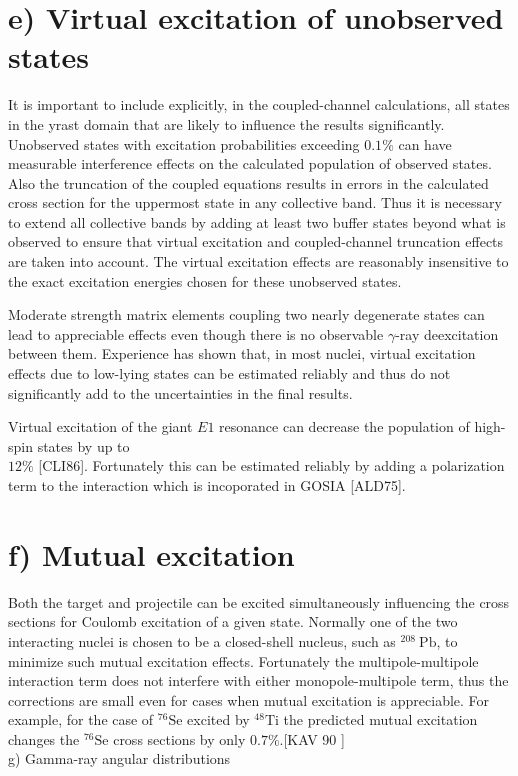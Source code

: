 \documentclass[10pt]{article}
\begin{document}
\section*{e) Virtual excitation of unobserved states}
It is important to include explicitly, in the coupled-channel calculations, all states in the yrast domain that are likely to influence the results significantly. Unobserved states with excitation probabilities exceeding $0.1 \%$ can have measurable interference effects on the calculated population of observed states. Also the truncation of the coupled equations results in errors in the calculated cross section for the uppermost state in any collective band. Thus it is necessary to extend all collective bands by adding at least two buffer states beyond what is observed to ensure that virtual excitation and coupled-channel truncation effects are taken into account. The virtual excitation effects are reasonably insensitive to the exact excitation energies chosen for these unobserved states.

Moderate strength matrix elements coupling two nearly degenerate states can lead to appreciable effects even though there is no observable $\gamma$-ray deexcitation between them. Experience has shown that, in most nuclei, virtual excitation effects due to low-lying states can be estimated reliably and thus do not significantly add to the uncertainties in the final results.

Virtual excitation of the giant $E 1$ resonance can decrease the population of high-spin states by up to\\
$12 \%$ [CLI86]. Fortunately this can be estimated reliably by adding a polarization term to the interaction which is incoporated in GOSIA [ALD75].

\section*{f) Mutual excitation}
Both the target and projectile can be excited simultaneously influencing the cross sections for Coulomb excitation of a given state. Normally one of the two interacting nuclei is chosen to be a closed-shell nucleus, such as ${ }^{208} \mathrm{~Pb}$, to minimize such mutual excitation effects. Fortunately the multipole-multipole interaction term does not interfere with either monopole-multipole term, thus the corrections are small even for cases when mutual excitation is appreciable. For example, for the case of ${ }^{76} \mathrm{Se}$ excited by ${ }^{48} \mathrm{Ti}$ the predicted mutual excitation changes the ${ }^{76} \mathrm{Se}$ cross sections by only $0.7 \%$.[KAV 90 ]\\
g) Gamma-ray angular distributions
\end{document}
